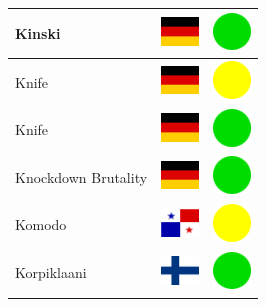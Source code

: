 \documentclass[12pt, a4paper, twoside]{report}
\begin{document}
\begin{center}
\begin{longtable}{|p{5cm}|p{2cm}|p{2cm}|}
Kinski & \includegraphics[width=1cm]{4x3/de} & \includegraphics[width=1cm]{likes/y} \\ \hline
Knife & \includegraphics[width=1cm]{4x3/de} & \includegraphics[width=1cm]{likes/m} \\ \hline
Knife & \includegraphics[width=1cm]{4x3/de} & \includegraphics[width=1cm]{likes/y} \\ \hline
Knockdown Brutality & \includegraphics[width=1cm]{4x3/de} & \includegraphics[width=1cm]{likes/y} \\ \hline
Komodo & \includegraphics[width=1cm]{4x3/pa} & \includegraphics[width=1cm]{likes/m} \\ \hline
Korpiklaani & \includegraphics[width=1cm]{4x3/fi} & \includegraphics[width=1cm]{likes/y} \\ \hline

\end{longtable}
\end{center}
\end{document}
